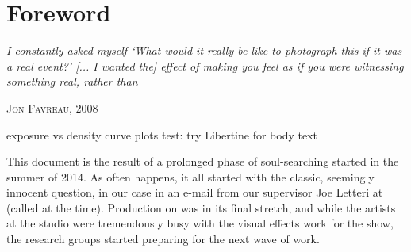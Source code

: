 
\chapter*{Foreword}\label{ch:foreword}

\epigraph{%
	\emph{I constantly asked myself `What would it really be like to photograph
		this if it was a real event?' [... I wanted the] effect of making you feel
		as if you were witnessing something real, rather than }}
{\textsc{Jon Favreau}, 2008}

\ifomit
exposure vs density curve plots
test: try Libertine for body text
\fi

\noindent This document is the result of a prolonged phase of soul-searching 
started in the summer of 2014. As often happens, it all started with the classic,
seemingly innocent question, in our case in an e-mail from our supervisor Joe Letteri
at  (called  at the time).
Production on \cite{hobbit3} was in its final stretch, and while the artists at the studio
were tremendously busy with the visual effects work for the show, the research groups
started preparing for the next wave of work. 

